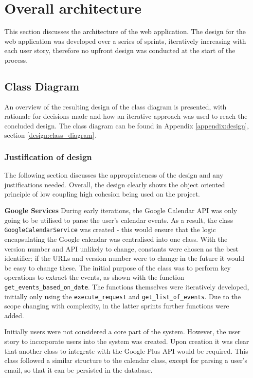 \section{Overall architecture}
This section discusses the architecture of the web application. The design for the web application was developed over a series of sprints, iteratively increasing with each user story, therefore no upfront design was conducted at the start of the process.

\subsection{Class Diagram}
\label{architecture:class}
An overview of the resulting design of the class diagram is presented, with rationale for decisions made and how an iterative approach was used to reach the concluded design. The class diagram can be found in Appendix \ref{appendix:design}, section \ref{design:class_diagram}.

\subsubsection{Justification of design}
The following section discusses the appropriateness of the design and any justifications needed. Overall, the design clearly shows the object oriented principle of low coupling high cohesion being used on the project.

\noindent
\textbf{Google Services}
\newline
During early iterations, the Google Calendar API was only going to be utilised to parse the user's calendar events. As a result, the class \texttt{GoogleCalendarService} was created - this would ensure that the logic encapsulating the Google calendar was centralised into one class. With the version number and API unlikely to change, constants were chosen as the best identifier; if the URLs and version number were to change in the future it would be easy to change these. The initial purpose of the class was to perform key operations to extract the events, as shown with the function \texttt{get\_events\_based\_on\_date}. The functions themselves were iteratively developed, initially only using the \texttt{execute\_request} and \texttt{get\_list\_of\_events}. Due to the scope changing with complexity, in the latter sprints  further functions were added.

Initially users were not considered a core part of the system. However, the user story to incorporate users into the system was created. Upon creation it was clear that another class to integrate with the Google Plus API would be required. This class followed a similar structure to the calendar class, except for parsing a user's email, so that it can be persisted in the database.

